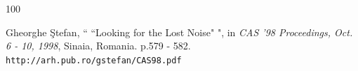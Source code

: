\begin{thebibliography}{100}





  Gheorghe \c Stefan,  `` ``Looking for the Lost Noise" ", in {\em CAS '98 Proceedings, Oct. 6 - 10, 1998}, Sinaia, Romania. p.579 - 582. \\ {\tt http://arh.pub.ro/gstefan/CAS98.pdf}






\end{thebibliography}
